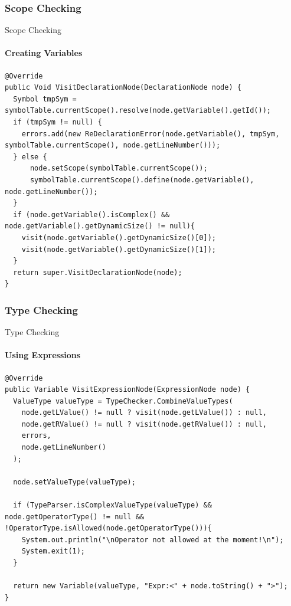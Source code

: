 \subsubsection{Scope Checking}
\begin{frame}[fragile,t]{Scope Checking}
\framesubtitle{Creating Variables}


\begin{lstlisting}[caption=The visit method for visiting a DeclarationNode in the Scope checker. ,frame=tlrb, basicstyle=\tiny, numbers=none]
@Override
public Void VisitDeclarationNode(DeclarationNode node) {
  Symbol tmpSym = symbolTable.currentScope().resolve(node.getVariable().getId());
  if (tmpSym != null) {
    errors.add(new ReDeclarationError(node.getVariable(), tmpSym, symbolTable.currentScope(), node.getLineNumber()));
  } else {
      node.setScope(symbolTable.currentScope());
      symbolTable.currentScope().define(node.getVariable(), node.getLineNumber());
  }
  if (node.getVariable().isComplex() && node.getVariable().getDynamicSize() != null){
    visit(node.getVariable().getDynamicSize()[0]);
    visit(node.getVariable().getDynamicSize()[1]);
  }
  return super.VisitDeclarationNode(node);
}
\end{lstlisting}

\end{frame}

\subsubsection{Type Checking}
\begin{frame}[fragile,t]{Type Checking}
\framesubtitle{Using Expressions}


\begin{lstlisting}[caption=The visit method for visiting a ExpressionNode in the Type checker. ,frame=tlrb, basicstyle=\tiny, numbers=none]
@Override
public Variable VisitExpressionNode(ExpressionNode node) {
  ValueType valueType = TypeChecker.CombineValueTypes(
    node.getLValue() != null ? visit(node.getLValue()) : null,
    node.getRValue() != null ? visit(node.getRValue()) : null,
    errors,
    node.getLineNumber()
  );

  node.setValueType(valueType);

  if (TypeParser.isComplexValueType(valueType) && node.getOperatorType() != null && !OperatorType.isAllowed(node.getOperatorType())){
    System.out.println("\nOperator not allowed at the moment!\n");
    System.exit(1);
  }

  return new Variable(valueType, "Expr:<" + node.toString() + ">");
}
\end{lstlisting}

\end{frame}

